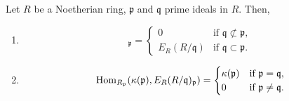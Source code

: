 \begin{prop}
	Let $R$ be a Noetherian ring, $\mathfrak{p}$ and $\mathfrak{q}$ prime ideals in $R$. Then,
	\begin{enumerate}
		\item 
		\begin{equation*} 
			[E_{R}(R/\mathfrak{q})]_{\mathfrak{p}} = 
			\begin{cases}
				0 & \text{if } \mathfrak{q} \not\subset \mathfrak{p}, \\
				E_{R}(R/\mathfrak{q}) & \text{if } \mathfrak{q} \subset \mathfrak{p}.
			\end{cases}
		\end{equation*}
		\item 
		\begin{equation*} 
			\operatorname{Hom}_{R_{\mathfrak{p}}}(\kappa(\mathfrak{p}), E_{R}(R/\mathfrak{q})_{\mathfrak{p}}) = 
			\begin{cases}
				\kappa(\mathfrak{p}) & \text{if } \mathfrak{p} = \mathfrak{q}, \\
				0 & \text{if } \mathfrak{p} \neq \mathfrak{q}.
			\end{cases}
		\end{equation*}
	\end{enumerate}
\end{prop}
